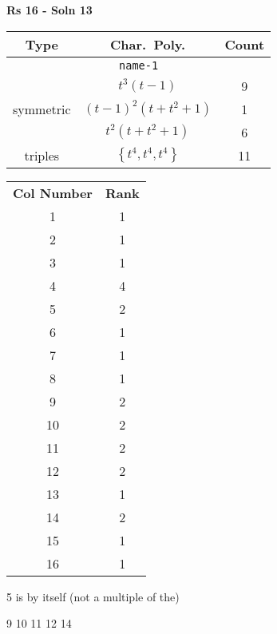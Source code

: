 \documentclass{article}
\begin{document}
    \textbf{Rs 16 - Soln 13}
    \begin{table}
    \begin{tabular}{|c|c|c|}
    \hline
    \textbf{Type} & \textbf{Char.~Poly.} & \textbf{Count} \\
    \hline \multicolumn{3}{|c|}{\texttt{name-1}} \\ \hline
    \multirow{3}{*}{symmetric}
    & $t^3(t - 1)$ & 9 \\
    & $(t - 1)^2(t + t^2 + 1)$ & 1 \\
    & $t^2(t + t^2 + 1)$ & 6 \\
    \hline
    \multirow{1}{*}{triples}
    & $\left\{t^4,t^4,t^4\right\}$ & 11 \\
    \hline
    \end{tabular}
    \end{table}
    \begin{table}
    \begin{tabular}{|c|c|}
    \hline
    \textbf{Col Number} & \textbf{Rank}\\
    1 & 1 \\ 
    2 & 1 \\ 
    3 & 1 \\ 
    4 & 4 \\ 
    5 & 2 \\ 
    6 & 1 \\ 
    7 & 1 \\ 
    8 & 1 \\ 
    9 & 2 \\ 
    10 & 2 \\ 
    11 & 2 \\ 
    12 & 2 \\ 
    13 & 1 \\ 
    14 & 2 \\ 
    15 & 1 \\ 
    16 & 1 \\ 
    \hline
    \end{tabular}
    \end{table}

    5 is by itself (not a multiple of the)

    9 10 11 12 14
    \newpage
\end{document}
